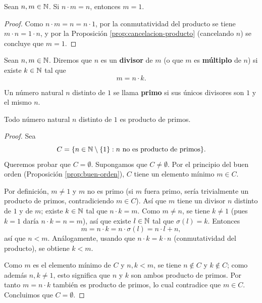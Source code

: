 \documentclass[12pt,a4paper]{book}
\begin{document}
    \begin{corolario}
        \label{coro:producto-uno}
        Sean $n,m\in\mathbb{N}$. Si $n\cdot m=n$, entonces $m=1$.
    \end{corolario}
    \begin{proof}
        Como $n\cdot m=n=n\cdot1$, por la conmutatividad del producto se tiene $m\cdot n=1\cdot n$, y por la Proposición \ref{prop:cancelacion-producto} (cancelando $n$) se concluye que $m=1$.
    \end{proof}

    \begin{definicion}
        Sean $n,m\in\mathbb{N}$. Diremos que $n$ es un \textbf{divisor} de $m$ (o que $m$ es \textbf{múltiplo} de $n$) si existe $k\in\mathbb{N}$ tal que
        \begin{equation*}
            m = n\cdot k.
        \end{equation*}
    \end{definicion}

    \begin{definicion}
        Un número natural $n$ distinto de $1$ se llama \textbf{primo} si sus únicos divisores son $1$ y el mismo $n$.
    \end{definicion}

    \begin{teorema}
        \label{thm:factorizacion-primos}
        Todo número natural $n$ distinto de $1$ es producto de primos.
    \end{teorema}
    \begin{proof}
        Sea
        \begin{equation*}
            C = \{n\in\mathbb{N}\setminus\{1\} : n \text{ no es producto de primos}\}.
        \end{equation*}
        Queremos probar que $C=\emptyset$. Supongamos que $C\neq\emptyset$. Por el principio del buen orden (Proposición \ref{prop:buen-orden}), $C$ tiene un elemento mínimo $m\in C$.

        Por definición, $m\neq1$ y $m$ no es primo (si $m$ fuera primo, sería trivialmente un producto de primos, contradiciendo $m\in C$). Así que $m$ tiene un divisor $n$ distinto de $1$ y de $m$; existe $k\in\mathbb{N}$ tal que $n\cdot k=m$. Como $m\neq n$, se tiene $k\neq1$ (pues $k=1$ daría $n\cdot k=n=m$), así que existe $l\in\mathbb{N}$ tal que $\sigma(l)=k$. Entonces
        \begin{equation*}
            m = n\cdot k = n\cdot\sigma(l) = n\cdot l+n,
        \end{equation*}
        así que $n<m$. Análogamente, usando que $n\cdot k=k\cdot n$ (conmutatividad del producto), se obtiene $k<m$.

        Como $m$ es el elemento mínimo de $C$ y $n,k<m$, se tiene $n\notin C$ y $k\notin C$; como además $n,k\neq1$, esto significa que $n$ y $k$ son ambos producto de primos. Por tanto $m=n\cdot k$ también es producto de primos, lo cual contradice que $m\in C$. Concluimos que $C=\emptyset$.
    \end{proof}
\end{document}
